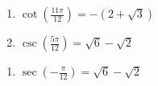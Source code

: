\begin{multicols}{2}

\begin{enumerate}

\setcounter{enumi}{\value{HW}}

\item $\cot \left( \frac{11\pi}{12} \right) = -(2 + \sqrt{3})$
\item $\csc \left( \frac{5\pi}{12} \right) = \sqrt{6} - \sqrt{2}$

\setcounter{HW}{\value{enumi}}

\end{enumerate}

\end{multicols}

\begin{multicols}{2}

\begin{enumerate}

\setcounter{enumi}{\value{HW}}

\item $\sec \left( -\frac{\pi}{12} \right) = \sqrt{6} - \sqrt{2}$

\setcounter{HW}{\value{enumi}}

\end{enumerate}

\end{multicols}

